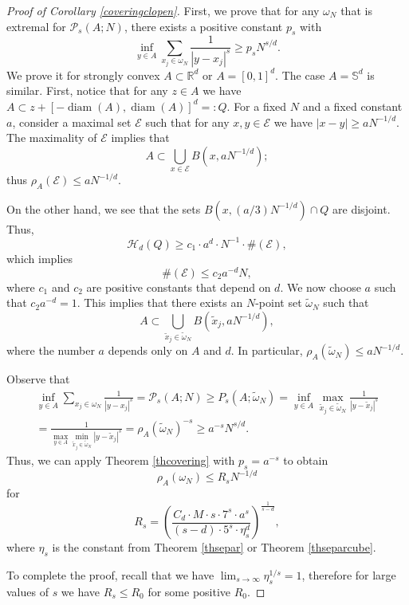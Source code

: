 \documentclass[12pt]{amsart}
\theoremstyle{definition}
\def\sli{\sum\limits}
\def\R{\mathbb{R}}
\newcommand{\1}{\mathbf{1}}
\newcommand{\diam}{\operatorname{diam}}
\newcommand{\PP}{\mathcal{P}}
\def\H{\mathcal{H}}
\begin{document}
\begin{proof}[Proof of Corollary \ref{coveringclopen}]
First, we prove that for any $\omega_N$ that is extremal for $\PP_s(A; N)$, there exists a positive constant $p_s$ with
$$
\inf_{y\in A} \sli_{x_j\in \omega_N} \frac{1}{|y-x_j|^s} \geqslant p_s N^{s/d}.
$$
We prove it for strongly convex $A\subset \R^d$ or $A=[0,1]^d$. The case $A=\mathbb{S}^d$ is similar. First, notice that for any $z\in A$ we have $A\subset z+[-\diam(A), \diam(A)]^d=:Q$.
For a fixed $N$ and a fixed constant $a$, consider a maximal set $\mathcal{E}$ such that for any $x,y\in \mathcal{E}$ we have $|x-y|\geqslant aN^{-1/d}$. The maximality of $\mathcal{E}$ implies that 
$$
A\subset \bigcup_{x\in \mathcal{E}}B(x, aN^{-1/d});
$$
thus $\rho_A(\mathcal{E})\leqslant aN^{-1/d}$.

On the other hand, we see that the sets $B(x, (a/3)N^{-1/d})\cap Q$ are disjoint. Thus, 
$$
\H_d(Q)\geqslant c_1 \cdot a^d\cdot N^{-1}\cdot \#(\mathcal{E}),
$$
which implies
$$
\#(\mathcal{E})\leqslant c_2 a^{-d}N,
$$
where $c_1$ and $c_2$ are positive constants that depend on $d$.
We now choose $a$ such that $c_2 a^{-d}=1$. This implies that there exists an $N$-point set $\widetilde{\omega}_N$ such that
$$
A\subset \bigcup_{\tilde{x}_j\in\widetilde\omega_N} B(\tilde x_j, aN^{-1/d}),
$$
where the number $a$ depends only on $A$ and $d$. In particular, $\rho_A(\widetilde{\omega}_N)\leqslant aN^{-1/d}$.

Observe that
\begin{multline}\label{frombelowcovering}
\inf_{y\in A} \sli_{x_j\in \omega_N} \frac{1}{|y-x_j|^s} =\PP_s(A; N)\geqslant P_s(A; \widetilde\omega_N)=\inf_{y\in A}\max_{\tilde x_j\in \widetilde\omega_N}\frac{1}{|y-\tilde x_j|^s} \\ =\frac{1}{\max_{y\in A}\min_{\tilde x_j\in \widetilde\omega_N} |y-\tilde x_j|^s} = \rho_A(\widetilde \omega_N)^{-s} \geqslant a^{-s} N^{s/d}.
\end{multline}
Thus, we can apply Theorem \ref{thcovering} with $p_s=a^{-s}$ to obtain
$$
\rho_{A}(\omega_N)\leqslant R_s N^{-1/d}
$$
for 
$$
R_s=\left(\frac{C_d\cdot M \cdot s\cdot  7^s \cdot a^s}{(s-d)\cdot 5^s \cdot \eta_s^{d} }\right)^{\frac{1}{s-d}},
$$
where $\eta_s$ is the constant from Theorem \ref{thsepar} or Theorem \ref{thseparcube}.

To complete the proof, recall that we have $\lim_{s\to \infty}\eta_s^{1/s} =1$, therefore for large values of $s$ we have $R_s\leqslant R_0$ for some positive $R_0$.
\end{proof}
\end{document}
